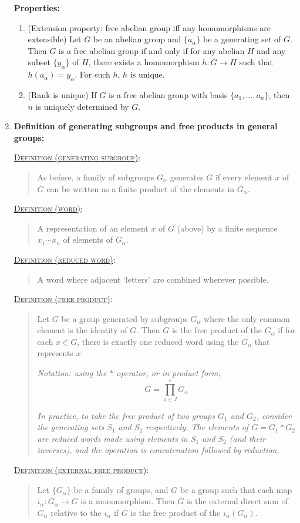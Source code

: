 \documentclass[letterpaper, 12pt]{book}
\newcommand{\defn}[2]{\textsc{\underline{Definition (#1)}:}\begin{quote} #2\end{quote}}
\begin{document}
\begin{enumerate}[resume]
        \textbf{Properties:}
            \begin{enumerate}
            \item (Extension property: free abelian group iff any homomorphisms are extensible) Let $G$ be an abelian group and $\{a_\alpha\}$ be a generating set of $G$. Then $G$ is a free abelian group if and only if for any abelian $H$ and any subset $\{y_\alpha\}$ of $H$, there exists a homomorphism $h: G\to H$ such that $h(a_\alpha) = y_\alpha$. For such $h$, $h$ is unique.
            \item (Rank is unique) If $G$ is a free abelian group with basis $\{a_1, \dots, a_n\}$, then $n$ is uniquely determined by $G$.
            \end{enumerate}
    \item \textbf{Definition of generating subgroups and free products in general groups:}

        \defn{generating subgroup}{As before, a family of subgroups $G_\alpha$ generates $G$ if every element $x$ of $G$ can be written as a finite product of the elements in $G_\alpha$.}

        \defn{word}{A representation of an element $x$ of $G$ (above) by a finite sequence $x_1\cdots x_n$ of elements of $G_\alpha$.}

        \defn{reduced word}{A word where adjacent `letters' are combined wherever possible.}

        \defn{free product}{Let $G$ be a group generated by subgroups $G_\alpha$ where the only common element is the identity of $G$. Then $G$ is the free product of the $G_\alpha$ if for each $x\in G$, there is exactly one reduced word using the $G_\alpha$ that represents $x$.

        \textit{Notation: using the $*$ operator, or in product form, \[
            G = \prod_{a\in J}^* G_\alpha
        \]}

        \textit{In practice, to take the free product of two groups $G_1$ and $G_2$, consider the generating sets $S_1$ and $S_2$ respectively. The elements of $G = G_1 * G_2$ are reduced words made using elements in $S_1$ and $S_2$ (and their inverses), and the operation is concatenation followed by reduction.}}

        \defn{external free product}{Let $\{G_\alpha\}$ be a family of groups, and $G$ be a group such that each map $i_\alpha : G_\alpha \to G$ is a monomorphism. Then $G$ is the external direct sum of $G_\alpha$ relative to the $i_\alpha$ if $G$ is the free product of the $i_\alpha(G_\alpha)$.

}
\end{enumerate}
\end{document}
